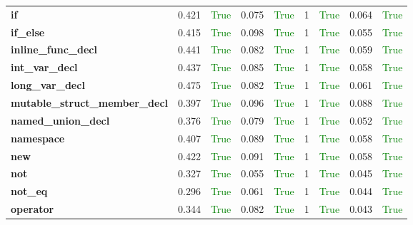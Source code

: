 \documentclass{article}
\begin{document}
\begin{xltabular}{\textwidth}{lcccccccc}
\textbf{{\fontsize{10}{12}\selectfont if}}& 0.421&\textcolor{green}{True}& 0.075&\textcolor{green}{True}& 1&\textcolor{green}{True}& 0.064&\textcolor{green}{True} \\[0.5ex]
\textbf{{\fontsize{10}{12}\selectfont if\_else}}& 0.415&\textcolor{green}{True}& 0.098&\textcolor{green}{True}& 1&\textcolor{green}{True}& 0.055&\textcolor{green}{True} \\[0.5ex]
\textbf{{\fontsize{10}{12}\selectfont inline\_func\_decl}}& 0.441&\textcolor{green}{True}& 0.082&\textcolor{green}{True}& 1&\textcolor{green}{True}& 0.059&\textcolor{green}{True} \\[0.5ex]
\textbf{{\fontsize{10}{12}\selectfont int\_var\_decl}}& 0.437&\textcolor{green}{True}& 0.085&\textcolor{green}{True}& 1&\textcolor{green}{True}& 0.058&\textcolor{green}{True} \\[0.5ex]
\textbf{{\fontsize{10}{12}\selectfont long\_var\_decl}}& 0.475&\textcolor{green}{True}& 0.082&\textcolor{green}{True}& 1&\textcolor{green}{True}& 0.061&\textcolor{green}{True} \\[0.5ex]
\textbf{{\fontsize{10}{12}\selectfont mutable\_struct\_member\_decl}}& 0.397&\textcolor{green}{True}& 0.096&\textcolor{green}{True}& 1&\textcolor{green}{True}& 0.088&\textcolor{green}{True} \\[0.5ex]
\textbf{{\fontsize{10}{12}\selectfont named\_union\_decl}}& 0.376&\textcolor{green}{True}& 0.079&\textcolor{green}{True}& 1&\textcolor{green}{True}& 0.052&\textcolor{green}{True} \\[0.5ex]
\textbf{{\fontsize{10}{12}\selectfont namespace}}& 0.407&\textcolor{green}{True}& 0.089&\textcolor{green}{True}& 1&\textcolor{green}{True}& 0.058&\textcolor{green}{True} \\[0.5ex]
\textbf{{\fontsize{10}{12}\selectfont new}}& 0.422&\textcolor{green}{True}& 0.091&\textcolor{green}{True}& 1&\textcolor{green}{True}& 0.058&\textcolor{green}{True} \\[0.5ex]
\textbf{{\fontsize{10}{12}\selectfont not}}& 0.327&\textcolor{green}{True}& 0.055&\textcolor{green}{True}& 1&\textcolor{green}{True}& 0.045&\textcolor{green}{True} \\[0.5ex]
\textbf{{\fontsize{10}{12}\selectfont not\_eq}}& 0.296&\textcolor{green}{True}& 0.061&\textcolor{green}{True}& 1&\textcolor{green}{True}& 0.044&\textcolor{green}{True} \\[0.5ex]
\textbf{{\fontsize{10}{12}\selectfont operator}}& 0.344&\textcolor{green}{True}& 0.082&\textcolor{green}{True}& 1&\textcolor{green}{True}& 0.043&\textcolor{green}{True} \\[0.5ex]

\end{xltabular}
\end{document}
